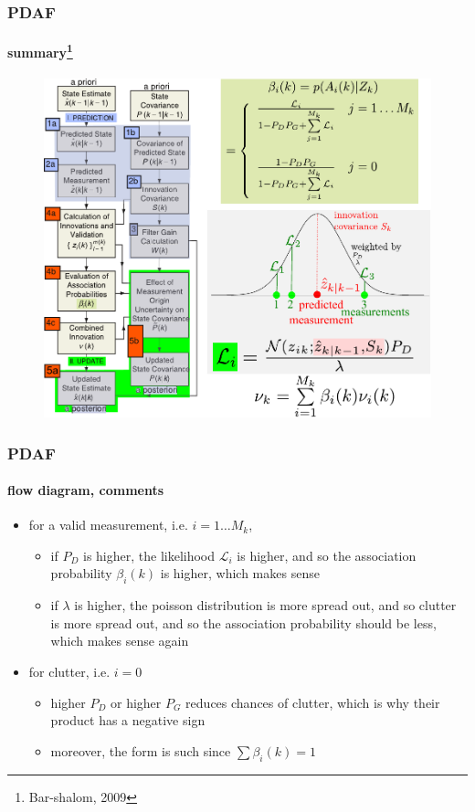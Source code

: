 \begin{frame}[plain]
\frametitle{PDAF}
\framesubtitle{summary\footnote{Bar-shalom, 2009}}
\logoCSIPCPL\mypagenum
	\begin{changemargin}{-1.3in}{0in}
		\begin{figure}
			\includegraphics[height=0.8\textheight]{figs/TRK_PDAF_flowDiagram.pdf}
		\end{figure}	
	\end{changemargin}
\end{frame}


\begin{frame}
\frametitle{PDAF}
\framesubtitle{flow diagram, comments}
\logoCSIPCPL\mypagenum
	\begin{itemize} 
		\item for a valid measurement, i.e. $i=1 \ldots M_k$, 
			\begin{itemize}
				\item if $P_D$ is higher, the likelihood $\mathcal{L}_i$ is higher, and so the association probability $\beta_i(k)$ is higher, which makes sense
				\item if $\lambda$ is higher, the poisson distribution is more spread out, and so clutter is more spread out, and so the association probability should be less, which makes sense again
			\end{itemize}
		\item for clutter, i.e. $i=0$
			\begin{itemize}
				\item higher $P_D$ or higher $P_G$ reduces chances of clutter, which is why their product has a negative sign
				\item moreover, the form is such since $\sum \beta_i(k)=1$
			\end{itemize}
	\end{itemize}
\end{frame}





